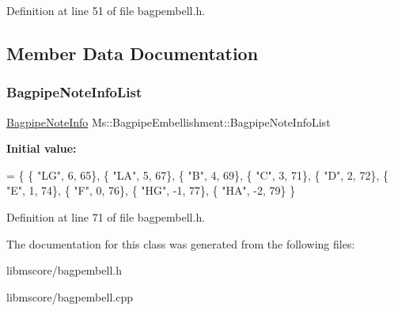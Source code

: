 Definition at line 51 of file bagpembell.\+h.



\subsection{Member Data Documentation}
\mbox{\label{class_ms_1_1_bagpipe_embellishment_af3b79f46c8124a23d9f3b86df3a43820}} 
\subsubsection{\texorpdfstring{Bagpipe\+Note\+Info\+List}{BagpipeNoteInfoList}}
{\footnotesize\ttfamily \hyperlink{struct_ms_1_1_bagpipe_note_info}{Bagpipe\+Note\+Info} Ms\+::\+Bagpipe\+Embellishment\+::\+Bagpipe\+Note\+Info\+List\hspace{0.3cm}{\ttfamily [static]}}

{\bfseries Initial value\+:}
\begin{DoxyCode}
= \{
      \{ \textcolor{stringliteral}{"LG"},  6,  65\},
      \{ \textcolor{stringliteral}{"LA"},  5,  67\},
      \{ \textcolor{stringliteral}{"B"},   4,  69\},
      \{ \textcolor{stringliteral}{"C"},   3,  71\}, 
      \{ \textcolor{stringliteral}{"D"},   2,  72\},
      \{ \textcolor{stringliteral}{"E"},   1,  74\},
      \{ \textcolor{stringliteral}{"F"},   0,  76\}, 
      \{ \textcolor{stringliteral}{"HG"}, -1,  77\},
      \{ \textcolor{stringliteral}{"HA"}, -2,  79\}
\}
\end{DoxyCode}


Definition at line 71 of file bagpembell.\+h.



The documentation for this class was generated from the following files\+:\begin{DoxyCompactItemize}
\item 
libmscore/bagpembell.\+h\item 
libmscore/bagpembell.\+cpp\end{DoxyCompactItemize}
